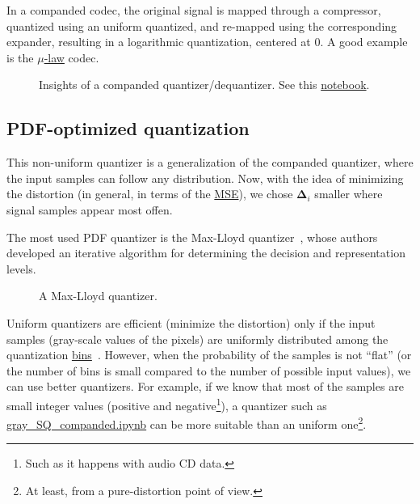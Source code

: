 In a companded codec, the original signal is mapped through a
compressor, quantized using an uniform quantized, and re-mapped using
the corresponding expander, resulting in a logarithmic quantization,
centered at $0$. A good example is the
\href{https://en.wikipedia.org/wiki/\%CE\%9C-law_algorithm}{\(\mu\)-law}
codec.

\begin{figure}
  \centering
  \caption{Insights of a companded quantizer/dequantizer. See this
    \href{https://nbviewer.jupyter.org/github/vicente-gonzalez-ruiz/scalar_quantization/blob/master/graphics/companded_quantization.ipynb}{notebook}.}
  \label{fig:companded_quantizer}
\end{figure}


\subsection{PDF-optimized quantization}

This non-uniform quantizer is a generalization of the companded
quantizer, where the input samples can follow any distribution. Now,
with the idea of minimizing the distortion (in general, in terms of
the \href{https://en.wikipedia.org/wiki/Mean_squared_error}{MSE}), we
chose ${\mathbf\Delta}_i$ smaller where signal samples appear most
offen.

The most used PDF quantizer is the Max-Lloyd
quantizer~\cite{lloyd1982least}, whose authors developed an iterative
algorithm for determining the decision and representation levels.

\begin{figure}
  \centering
  \caption{A Max-Lloyd quantizer.}
  \label{fig:Max-Lloyd}
\end{figure}

Uniform quantizers are efficient (minimize the distortion) only if the
input samples (gray-scale values of the pixels) are uniformly
distributed among the quantization
\href{https://en.wikipedia.org/wiki/Data_binning}{bins}~\cite{vruiz__scalar_quantization}. However,
when the probability of the samples is not ``flat'' (or the number of
bins is small compared to the number of possible input values), we can
use better quantizers. For example, if we know that most of the
samples are small integer values (positive and negative\footnote{Such
as it happens with audio CD data.}), a quantizer such as
\href{https://github.com/Sistemas-Multimedia/Sistemas-Multimedia.github.io/blob/master/contents/gray_SQ/gray_SQ_companded.ipynb}{gray\_SQ\_companded.ipynb}
can be more suitable than an uniform one\footnote{At least, from a
  pure-distortion point of view.}.

